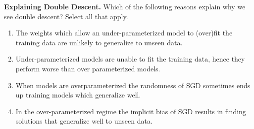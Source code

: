 \item{}
\textbf{Explaining Double Descent.}
Which of the following reasons explain why we see double descent? Select all that apply.

\begin{enumerate}[label=(\alph*)]
    \item The weights which allow an under-parameterized model to (over)fit the training data are unlikely to generalize to unseen data.
    \item Under-parameterized models are unable to fit the training data, hence they perform worse than over parameterized models.
    \item When models are overparameterized the randomness of SGD sometimes ends up training models which generalize well.
    \item In the over-parameterized regime the implicit bias of SGD results in finding solutions that generalize well to unseen data.
\end{enumerate} 
